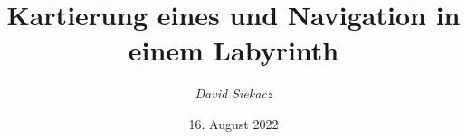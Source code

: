 \title{Kartierung eines und Navigation in einem Labyrinth}
\author{\textit{David Siekacz}}
\date{16. August 2022}

\subject{Kooperationsprojekt}
\publishers{Betreut durch Prof. Dr. Thomas Ihme}
\usepackage[defernumbers=true,backend=biber,
isbn=false,                  %
autocite=inline,             %
style=ieee,       %
hyperref=true,                  %
citestyle=numeric-comp,         %
natbib=true                     %
]{biblatex}  

